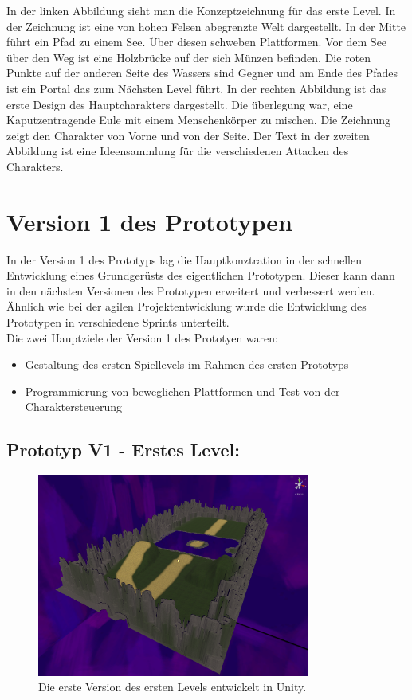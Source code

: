   In der linken Abbildung sieht man die Konzeptzeichnung für das erste Level. In der Zeichnung ist eine von hohen Felsen abegrenzte Welt dargestellt. In der Mitte führt ein Pfad zu einem See. Über diesen schweben Plattformen. Vor dem See über den Weg ist eine Holzbrücke auf der sich Münzen befinden. Die roten Punkte auf der anderen Seite des Wassers sind Gegner und am Ende des Pfades ist ein Portal das zum Nächsten Level führt.
  In der rechten Abbildung ist das erste Design des Hauptcharakters dargestellt. Die überlegung war, eine Kaputzentragende Eule mit einem Menschenkörper zu mischen. Die Zeichnung zeigt den Charakter von Vorne und von der Seite. Der Text in der zweiten Abbildung ist eine Ideensammlung für die verschiedenen Attacken des Charakters. 
\pagebreak

\section{Version 1 des Prototypen}
In der Version 1 des Prototyps lag die Hauptkonztration in der schnellen Entwicklung eines Grundgerüsts des eigentlichen Prototypen. Dieser kann dann in den nächsten Versionen des Prototypen erweitert und verbessert werden. Ähnlich wie bei der agilen Projektentwicklung wurde die Entwicklung des Prototypen in verschiedene \glqq Sprints \grqq unterteilt. \\

Die zwei Hauptziele der Version 1 des Prototyen waren: 
\begin{itemize}
  \item Gestaltung des ersten Spiellevels im Rahmen des ersten Prototyps
  \item Programmierung von beweglichen Plattformen und Test von der Charaktersteuerung
\end{itemize}

\subsection{Prototyp V1 - Erstes Level:}

\begin{figure}[h]
  \centering
  \includegraphics*[width=0.8\textwidth]{chapters/04/images/V1/V1.png}
  \caption{Die erste Version des ersten Levels entwickelt in Unity.}
  \label{fig:PE03}
\end{figure}

